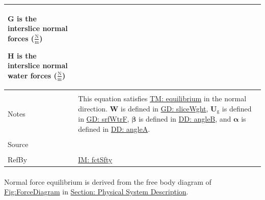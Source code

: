 \documentclass[12pt]{article}
\begin{document}
\begin{minipage}{\textwidth}
\begin{tabular}{>{\raggedright}p{}>{\raggedright\arraybackslash}p{}}
\begin{symbDescription}
              \item{$\mathbf{G}$ is the interslice normal forces ($\frac{\text{N}}{\text{m}}$)}
              \item{$\mathbf{H}$ is the interslice normal water forces ($\frac{\text{N}}{\text{m}}$)}
              \end{symbDescription}
\\ \midrule \\
Notes & This equation satisfies \hyperref[TM:equilibrium]{TM: equilibrium} in the normal direction. $\mathbf{W}$ is defined in \hyperref[GD:sliceWght]{GD: sliceWght}, ${\mathbf{U}_{\text{g}}}$ is defined in \hyperref[GD:srfWtrF]{GD: srfWtrF}, $\mathbf{β}$ is defined in \hyperref[DD:angleB]{DD: angleB}, and $\mathbf{α}$ is defined in \hyperref[DD:angleA]{DD: angleA}.
\\ \midrule \\
Source & \cite{chen2005}
\\ \midrule \\
RefBy & \hyperref[IM:fctSfty]{IM: fctSfty}
\\ \bottomrule
\end{tabular}
\end{minipage}
\paragraph{}
\label{GD:normForcEqDeriv}
Normal force equilibrium is derived from the free body diagram of \hyperref[Figure:ForceDiagram]{Fig:ForceDiagram} in \hyperref[Sec:PhysSyst]{Section: Physical System Description}.
\par~
\end{document}
